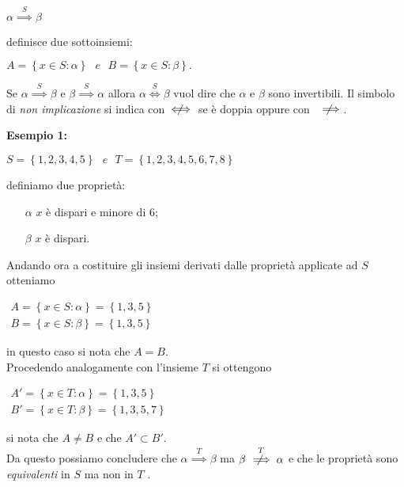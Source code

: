 \documentclass[a4paper]{article}
\newcommand{\nlongRightarrow}{\mkern12mu\not\mkern-10mu\implies}
\newcommand{\nlongLeftRightarrow}{\mkern12mu\not\mkern-14mu\iff}
\newcommand{\n}{\par \noindent \newline}
\begin{document}
\begin{center}
	$\alpha \stackrel{S}{\implies} \beta$
\end{center}
 definisce due sottoinsiemi:
 \begin{center}
 	\begin{math}
 		A=\left\lbrace x \in S:\alpha \right\rbrace \ \ \ e \ \ \ B=\left\lbrace x \in S:\beta \right\rbrace.
 	\end{math}
 \end{center}
Se $\alpha \stackrel{S}{\implies} \beta$ e $\beta \stackrel{S}{\implies} \alpha$ allora $\alpha \stackrel{S}{\iff} \beta$ vuol dire che $\alpha$ e $\beta$ sono invertibili.
Il simbolo di \textit{non implicazione} si indica con $ \nlongLeftRightarrow$ se è doppia oppure con  $\ \nlongRightarrow$.
\n
\textbf{Esempio 1:}
\begin{center}
	\begin{math}
		S=\left\lbrace 1,2,3,4,5 \right\rbrace \ \ \ e \ \ \ T=\left\lbrace 1,2,3,4,5,6,7,8\right\rbrace 
	\end{math}
\end{center}
definiamo due proprietà:
\begin{enumerate}
	\item[$\alpha$] $x$ è dispari e minore di 6;
	\item[$\beta$] $x$ è dispari.
\end{enumerate}
Andando ora a costituire gli insiemi derivati dalle proprietà applicate ad $S$ otteniamo
 \begin{center}
	\begin{math}
		\begin{array}{l}
				A=\left\lbrace x \in S:\alpha\right\rbrace =\left\lbrace 1,3,5\right\rbrace \\ 
				B=\left\lbrace x \in S:\beta\right\rbrace =\left\lbrace 1,3,5\right\rbrace 
		\end{array}
	\end{math}

\end{center}
in questo caso si nota che $A=B$.\\
Procedendo analogamente con l'insieme $T$ si ottengono
\begin{center}
\begin{math}
	\begin{array}{l}
		A'=\left\lbrace x \in T:\alpha\right\rbrace =\left\lbrace 1,3,5\right\rbrace \\ 
		B'=\left\lbrace x \in T:\beta\right\rbrace =\left\lbrace 1,3,5,7\right\rbrace 
	\end{array}
\end{math}
\end{center}
si nota che $A \neq B$ e che $A' \subset B'$.\\
Da questo possiamo concludere che $\alpha \stackrel{T}{\implies} \beta$ ma $\beta \stackrel{T}{\nlongRightarrow} \alpha$ e che le proprietà sono \textit{equivalenti} in $S$ ma non in $T$ .
\end{document}
